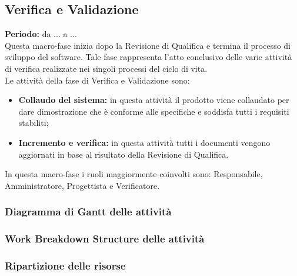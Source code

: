 \subsection{Verifica e Validazione}
	\textbf{Periodo:} da ... a ... \\
	Questa macro-fase inizia dopo la Revisione di Qualifica e termina il processo di sviluppo del software. Tale fase rappresenta l'atto conclusivo delle varie attività di verifica realizzate nei singoli processi del ciclo di vita. \\
	Le attività della fase di Verifica e Validazione sono: \\
	\begin{itemize}
		\item \textbf{Collaudo del sistema:} in questa attività il prodotto viene collaudato per dare
dimostrazione che è conforme alle specifiche e soddisfa tutti i requisiti stabiliti; \\
		\item \textbf{Incremento e verifica:} in questa attività tutti i documenti vengono aggiornati in base al risultato della Revisione di Qualifica. \\
	\end{itemize}
	In questa macro-fase i ruoli maggiormente coinvolti sono: Responsabile, Amministratore, Progettista e Verificatore.
\subsubsection{Diagramma di Gantt delle attività}
\subsubsection{Work Breakdown Structure delle attività}
\subsubsection{Ripartizione delle risorse}